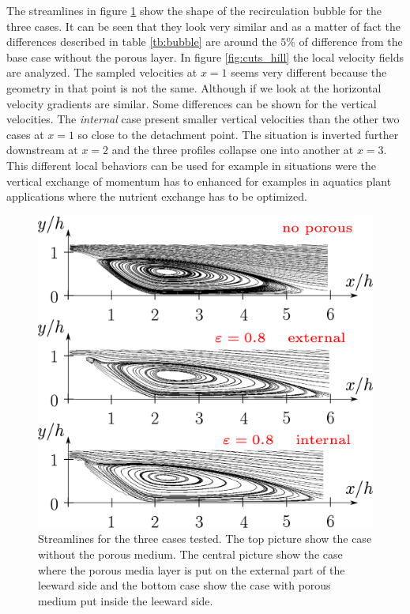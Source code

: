 The streamlines in figure \ref{fig:streamlines} show the shape of the recirculation bubble for the three cases. It can be seen that they look very similar and as a matter of fact the differences described in table \ref{tb:bubble} are around the $5\%$ of difference from the base case without the porous layer.
In figure \ref{fig:cuts_hill} the local velocity fields are analyzed. The sampled velocities at $x=1$ seems very different because the geometry in that point is not the same. Although if we look at the horizontal velocity gradients are similar. Some differences can be shown for the vertical velocities. The \textit{internal} case present smaller vertical velocities than the other two cases at $x=1$ so close to the detachment point. The situation is inverted further downstream at $x=2$ and the three profiles collapse one into another at $x=3$. This different local behaviors can be used for example in situations were the vertical exchange of momentum has to enhanced for examples in aquatics plant applications where the nutrient exchange has to be optimized.

\begin{figure}[H]
	\centering
	\includegraphics[width=1\linewidth]{chapter_5/figure/streamlines}
	\caption{Streamlines for the three cases tested. The top picture show the case without the porous medium. The central picture show the case where the porous media layer is put on the external part of the leeward side and the bottom case show the case with porous medium put inside the leeward side.}
	\label{fig:streamlines}
\end{figure}


